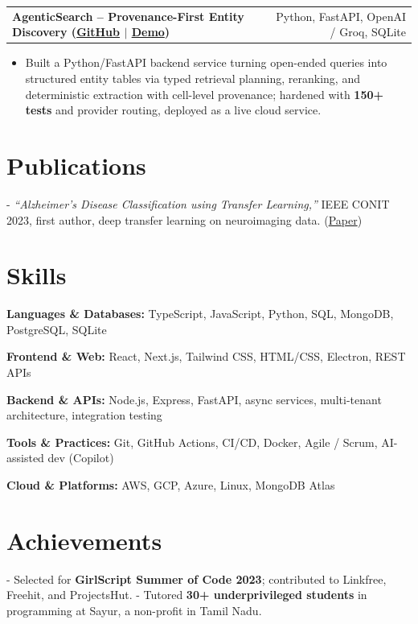 \documentclass[letterpaper,11pt]{article}
\makeatletter
\newcommand{\projItem}[2]{%
  \vspace{6pt}
  \begin{tabular*}{\textwidth}{@{}l@{\extracolsep{\fill}}r@{}}
    \textbf{#1} & #2 \\
  \end{tabular*}\par\vspace{-2pt}
}
\newcommand{\skillLine}[2]{\textbf{#1:} #2\par\vspace{2pt}}
\newcommand{\inlineBlock}[1]{{\setlength{\leftskip}{0.18in}\small #1\par}}
\makeatother
\begin{document}
\projItem{AgenticSearch -- Provenance-First Entity Discovery {\normalfont\small(\href{https://github.com/Deva-1903/ciir_agentic_search}{GitHub} $\vert$ \href{https://agentic-search-negglszkwa-uc.a.run.app}{Demo})}}{Python, FastAPI, OpenAI / Groq, SQLite}
\begin{itemize}
  \item Built a Python/FastAPI backend service turning open-ended queries into structured entity tables via typed retrieval planning, reranking, and deterministic extraction with cell-level provenance; hardened with \textbf{150+ tests} and provider routing, deployed as a live cloud service.
\end{itemize}

\section{Publications}
\inlineBlock{- \textit{``Alzheimer's Disease Classification using Transfer Learning,''} IEEE CONIT 2023, first author, deep transfer learning on neuroimaging data. {\normalfont\small(\href{https://ieeexplore.ieee.org/document/10205760}{Paper})}}

\section{Skills}
\skillLine{Languages \& Databases}{TypeScript, JavaScript, Python, SQL, MongoDB, PostgreSQL, SQLite}
\skillLine{Frontend \& Web}{React, Next.js, Tailwind CSS, HTML/CSS, Electron, REST APIs}
\skillLine{Backend \& APIs}{Node.js, Express, FastAPI, async services, multi-tenant architecture, integration testing}
\skillLine{Tools \& Practices}{Git, GitHub Actions, CI/CD, Docker, Agile / Scrum, AI-assisted dev (Copilot)}
\skillLine{Cloud \& Platforms}{AWS, GCP, Azure, Linux, MongoDB Atlas}

\section{Achievements}
\inlineBlock{- Selected for \textbf{GirlScript Summer of Code 2023}; contributed to Linkfree, Freehit, and ProjectsHut. - Tutored \textbf{30+ underprivileged students} in programming at Sayur, a non-profit in Tamil Nadu.}
\end{document}

